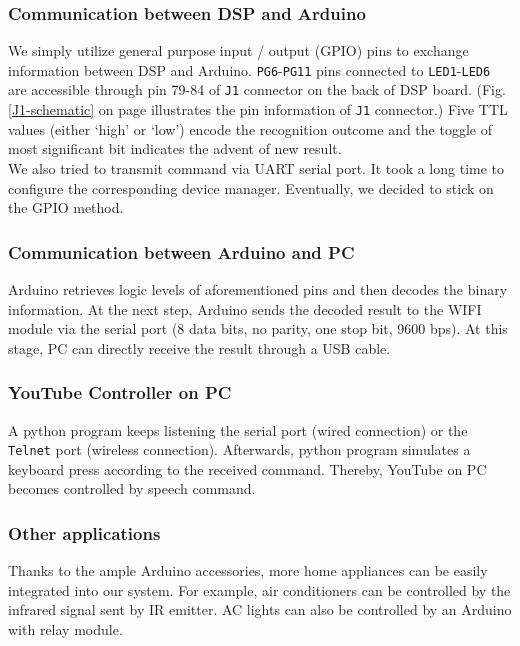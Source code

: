 \subsubsection{Communication between DSP and Arduino}
We simply utilize general purpose input / output (GPIO) pins to exchange information between DSP and Arduino. \texttt{PG6}-\texttt{PG11} pins connected to \texttt{LED1}-\texttt{LED6} are accessible through pin 79-84 of \texttt{J1} connector on the back of DSP board. (Fig. \ref{J1-schematic} on page \pageref{J1-schematic} illustrates the pin information of \texttt{J1} connector.) Five TTL values (either `high' or `low') encode the recognition outcome and the toggle of most significant bit indicates the advent of new result.\\

We also tried to transmit command via UART serial port. It took a long time to configure the corresponding device manager. Eventually, we decided to stick on the GPIO method.

\subsubsection{Communication between Arduino and PC}
Arduino retrieves logic levels of aforementioned pins and then decodes the binary information. At the next step, Arduino sends the decoded result to the WIFI module via the serial port (8 data bits, no parity, one stop bit, 9600 bps). At this stage, PC can directly receive the result through a USB cable.

\subsubsection{YouTube Controller on PC}
A python program keeps listening the serial port (wired connection) or the \texttt{Telnet} port (wireless connection). Afterwards, python program simulates a keyboard press according to the received command. Thereby, YouTube on PC becomes controlled by speech command.

\subsubsection{Other applications}
Thanks to the ample Arduino accessories, more home appliances can be easily integrated into our system. For example, air conditioners can be controlled by the infrared signal sent by IR emitter. AC lights can also be controlled by an Arduino with relay module.

